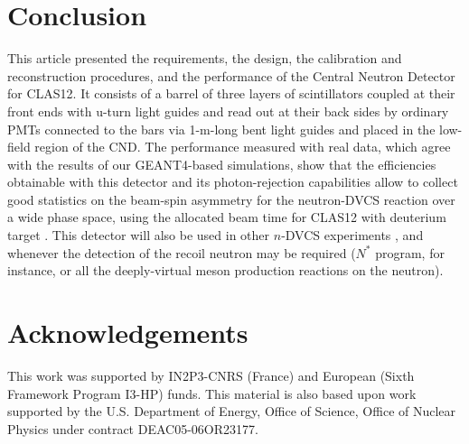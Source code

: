 \section{Conclusion}
This article presented the requirements, the design, the calibration and reconstruction procedures, and the performance of the Central Neutron Detector for CLAS12. It consists of a barrel of three layers of scintillators coupled at their front ends with u-turn light guides and read out at their back sides by ordinary PMTs connected to the bars via 1-m-long bent light guides and placed in the low-field region of the CND. 
The performance measured with real data, which agree with the results of our GEANT4-based simulations, show that the efficiencies obtainable with this detector and its photon-rejection capabilities allow to collect good statistics on the beam-spin asymmetry for the neutron-DVCS reaction over a wide phase space, using the allocated beam time for CLAS12 with deuterium target \cite{Jlab12_CLAS_n}. This detector will also be used in other $n$-DVCS experiments \cite{Jlab12_CLAS_n_pol}, and whenever the detection of the recoil neutron may be required ($N^*$ program, for instance, or all the deeply-virtual meson production reactions on the neutron). 
\section{Acknowledgements}
This work was supported by IN2P3-CNRS (France) and European (Sixth Framework Program I3-HP) funds. This material is also based upon work supported by the U.S. Department of Energy, Office of Science, Office of Nuclear Physics under contract DEAC05-06OR23177.




